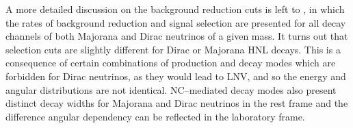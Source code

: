 A more detailed discussion on the background reduction cuts is left to , %
in which the rates of background reduction and signal selection are presented %
for all decay channels of both Majorana and Dirac neutrinos of a given mass.
It turns out that selection cuts are slightly different for Dirac or Majorana HNL decays.
This is a consequence of certain combinations of production and decay modes which are forbidden for Dirac neutrinos, %
as they would lead to LNV, and so the energy and angular distributions are not identical.
NC--mediated decay modes also present distinct decay widths for Majorana and Dirac neutrinos in the rest frame %
and the difference angular dependency can be reflected in the laboratory frame.



